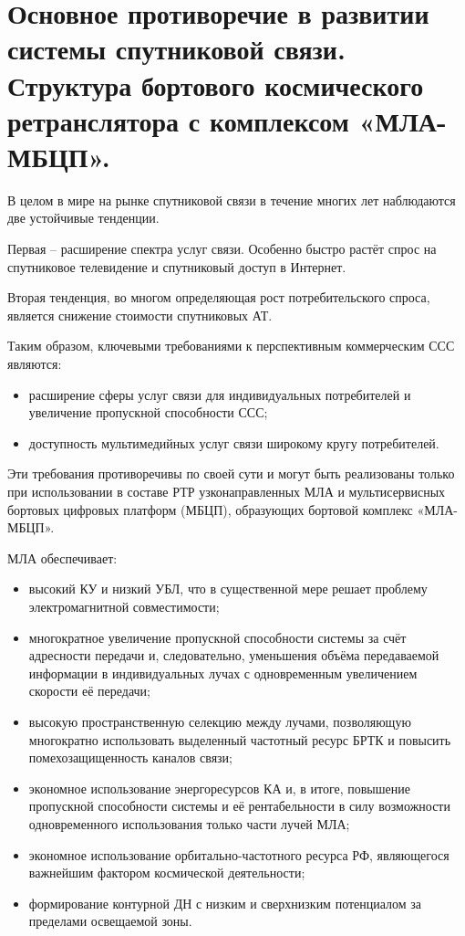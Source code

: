 \documentclass[14pt,a4paper,oneside]{extarticle}
\begin{document}
\section{Основное противоречие в развитии системы спутниковой связи. Структура бортового космического ретранслятора с комплексом «МЛА-МБЦП».}

В целом в мире на рынке спутниковой связи в течение многих лет наблюдаются две устойчивые тенденции.

Первая – расширение спектра услуг связи. Особенно быстро растёт спрос на спутниковое телевидение и спутниковый доступ в Интернет.

Вторая тенденция, во многом определяющая рост потребительского спроса, является снижение стоимости спутниковых АТ.

Таким образом, ключевыми требованиями к перспективным коммерческим ССС являются:

\begin{itemize}
    \item расширение сферы услуг связи для индивидуальных потребителей и увеличение пропускной способности ССС;
    \item доступность мультимедийных услуг связи широкому кругу потребителей.
\end{itemize}

Эти требования противоречивы по своей сути и могут быть реализованы только при использовании в составе РТР узконаправленных МЛА и мультисервисных бортовых цифровых платформ (МБЦП), образующих бортовой комплекс «МЛА-МБЦП».

МЛА обеспечивает:

\begin{itemize}
    \item высокий КУ и низкий УБЛ, что в существенной мере решает проблему электромагнитной совместимости;
    \item многократное увеличение пропускной способности системы за счёт адресности передачи и, следовательно, уменьшения объёма передаваемой информации в индивидуальных лучах с одновременным увеличением скорости её передачи;
    \item высокую пространственную селекцию между лучами, позволяющую многократно использовать выделенный частотный ресурс БРТК и повысить помехозащищенность каналов связи;
    \item экономное использование энергоресурсов КА и, в итоге, повышение пропускной способности системы и её рентабельности в силу возможности одновременного использования только части лучей МЛА;
    \item экономное использование орбитально-частотного ресурса РФ, являющегося важнейшим фактором космической деятельности;
    \item формирование контурной ДН с низким и сверхнизким потенциалом за пределами освещаемой зоны.

\end{itemize}
\end{document}
